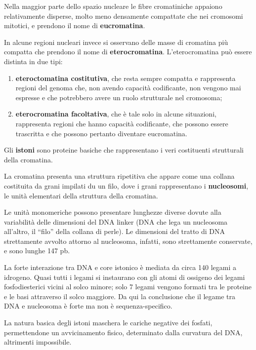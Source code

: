 \documentclass[11pt]{book}
\begin{document}
Nella maggior parte dello spazio nucleare le fibre cromatiniche appaiono
relativamente disperse, molto meno densamente compattate che nei
cromosomi mitotici, e prendono il nome di \textbf{eucromatina}.

In alcune regioni nucleari invece si osservano delle masse di cromatina
più compatta che prendono il nome di \textbf{eterocromatina}.
L'eterocromatina può essere distinta in due tipi:

\begin{enumerate}
\def\labelenumi{\arabic{enumi}.}
\itemsep1pt\parskip0pt
\item
  \textbf{eteroctomatina costitutiva}, che resta sempre compatta e
  rappresenta regioni del genoma che, non avendo capacità codificante,
  non vengono mai espresse e che potrebbero avere un ruolo strutturale
  nel cromosoma;
\item
  \textbf{eterocromatina facoltativa}, che è tale solo in alcune
  situazioni, rappresenta regioni che hanno capacità codificante, che
  possono essere trascritta e che possono pertanto diventare
  eucromatina.
\end{enumerate}

Gli \textbf{istoni} sono proteine basiche che rappresentano i veri
costituenti strutturali della cromatina.

La cromatina presenta una struttura ripetitiva che appare come una
collana costituita da grani impilati du un filo, dove i grani
rappresentano i \textbf{nucleosomi}, le unità elementari della struttura
della cromatina.

Le unità monomeriche possono presentare lunghezze diverse dovute alla
variabilità delle dimensioni del DNA linker (DNA che lega un nucleosoma
all'altro, il ``filo'' della collana di perle). Le dimensioni del tratto
di DNA strettamente avvolto attorno al nucleosoma, infatti, sono
strettamente conservate, e sono lunghe 147 pb.

La forte interazione tra DNA e core istonico è mediata da circa 140
legami a idrogeno. Quasi tutti i legami si instaurano con gli atomi di
ossigeno dei legami fosfodiesterici vicini al solco minore; solo 7
legami vengono formati tra le proteine e le basi attraverso il solco
maggiore. Da qui la conclusione che il legame tra DNA e nucleosoma è
forte ma non è sequenza-specifico.

La natura basica degli istoni maschera le cariche negative dei fosfati,
permettendone un avvicinamento fisico, determinato dalla curvatura del
DNA, altrimenti impossibile.
\end{document}
